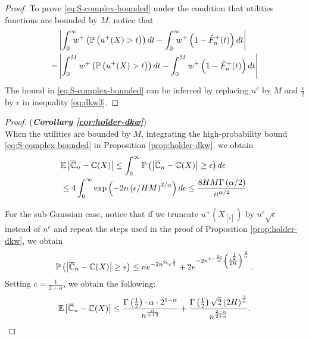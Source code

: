 \begin{proof}
To prove \eqref{eq:S-complex-bounded} under the condition that utilities functions are bounded by $M$, notice that
\begin{align*}
&\left|\int_0^{\infty}\!\!\!\! w^+\left(\Prob{u^+(X)>t}\right) dt- \int_0^{\infty} \!\!\!\! w^+\left(1- {\hat F^+_n}(t)\right) dt\right| \\ = &
    \left|\int_0^{M} w^+\left(\Prob{u^+(X)>t}\right) dt- \int_0^{M} w^+\left(1- {\hat F^+_n}(t)\right) dt\right|
\end{align*}
The  bound in \eqref{eq:S-complex-bounded} can be inferred by replacing $n^c$ by $M$ and $\frac{\epsilon}{2}$ by $\epsilon$ in inequality \eqref{eq:dkw3}.
\end{proof}

\begin{proof}(\textbf{\textit{Corollary \ref{cor:holder-dkw}}})\ \\
 When the utilities are bounded by $M$, integrating the high-probability bound \eqref{eq:S-complex-bounded} in Proposition \ref{prop:holder-dkw}, we obtain
 \begin{align}
& \mathbb{E} \left|\overline {\mathbb{C}}_n- \mathbb{C}(X) \right|  
  \le \int_0^{\infty} \mathbb{P}\left( \left|\overline {\mathbb{C}}_n- \mathbb{C}(X) \right| \geq  \epsilon \right) d\epsilon\nonumber\\
  &\le 4 \int_0^{\infty} \exp\left(-2n\left(\epsilon/HM\right)^{2/\alpha}\right) d\epsilon \le \frac{8HM \Gamma\left(\alpha/2\right)}{n^{\alpha/2}}.\label{eq:cor12-bd}
 \end{align}

For the sub-Gaussian case, notice that if we truncate $u^+\left(X_{[i]}\right)$  by $n^c\sqrt{\epsilon}$ instead of $n^c$ and repeat the steps used in the proof of Proposition
\ref{prop:holder-dkw}, we obtain
$$
\mathbb{P}\left( \left|\overline {\mathbb{C}}_n- \mathbb{C}(X) \right| \geq  \epsilon \right) \leq n e^{-2n^{2c}\epsilon^{\frac{1}{2}}} 
+ 2 e^{-2n^{1-\frac{2c}{\alpha}}\left(\frac{\epsilon^{\frac{1}{2}}}{2H}\right)^{\frac{2}{\alpha}}}\,.
$$
Setting $c=\frac{1}{2+\alpha}$,
we obtain the following:
$$\mathbb{E} \left|\overline {\mathbb{C}}_n- \mathbb{C}(X) \right| \le \frac{\Gamma\left(\frac{1}{2}\right)\cdot \alpha \cdot 2^{1-\alpha}}{n^{\frac{\alpha}{\alpha+2}}} + \frac{\Gamma\left(\frac{1}{2}\right)\sqrt{2}\left(2H\right)^{\frac{2}{\alpha}}}{n^{\frac{2-\alpha}{2+\alpha}}}.$$
\end{proof}

